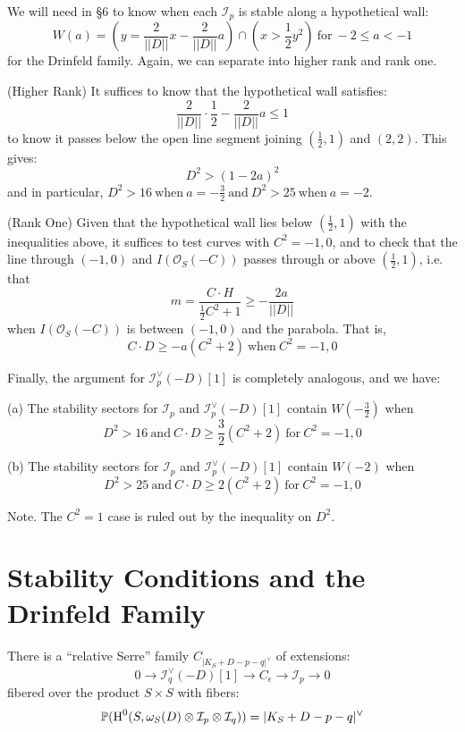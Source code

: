 \documentclass{amsart}
\begin{document}
\medskip


We will need in \S 6 to know when each ${\mathcal I}_p$ is stable along a hypothetical wall:
\[ W(a) = \left( y = \frac 2{||D||}x - \frac 2{||D||} a\right) \cap \left( x > \frac 12y^2\right)  \ \mbox{for} \ -2 \le a < -1 \] 
for the Drinfeld family.
Again, we can separate into higher rank and rank one. 

\medskip

\nt (Higher Rank) It suffices to know that the hypothetical wall satisfies:
\[ \frac 2{||D||} \cdot \frac 12 - \frac 2{||D||}a \le 1 \]  
to know it passes  below the open line segment joining $(\frac 12, 1)$ and $(2,2)$. This gives: 
\[ D^2 > (1 - 2a)^2 \] 
and in particular, 
$D^2 > 16 \ \mbox{when} \ a = -\frac 32 \ \mbox{and} \ D^2 > 25 \ \mbox{when} \ a = -2$.

\medskip 

\nt (Rank One) Given that the hypothetical wall lies below $(\frac 12,1)$ with the inequalities above, it suffices to 
test curves with $C^2 = -1, 0$, and to check that the line through 
$(-1,0)$ and $I({\mathcal O}_S(-C))$ passes through or above $(\frac 12, 1)$, i.e. that 
\[  m = \frac{C\cdot H}{\frac 12 C^2 + 1} \ge -\frac{2a}{||D||}  \] 
when $I({\mathcal O}_S(-C))$ is between $(-1,0)$ and the parabola. That is, 
\[ C \cdot D \ge -a(C^2 + 2) \ \mbox{when} \ C^2 = -1,0 \]  

Finally, the argument for ${\mathcal I}^\vee_p(-D)[1]$ is completely analogous, and we have: 

\medskip

 (a) The stability sectors for ${\mathcal I}_p$ and ${\mathcal I}_p^\vee(-D)[1]$ contain $W(-\frac 32)$ when
 \[ D^2 > 16 \ \mbox{and} \  C \cdot D \ge \frac 32(C^2 + 2)  \ \mbox{for} \ C^2 = -1,0 \] 

(b) The stability sectors for ${\mathcal I}_p$ and ${\mathcal I}_p^\vee(-D)[1]$ contain $W(-2)$ when
\[ D^2 > 25 \ \mbox{and} \  C \cdot D \ge 2(C^2 + 2)  \ \mbox{for} \ C^2 = -1,0 \] 

\nt Note. The  $C^2 = 1$ case is ruled out by the inequality on $D^2$. 

\section{Stability Conditions and the Drinfeld Family} 

There is a  ``relative Serre'' family $C_{|K_S + D - p - q|^\vee}$  of extensions: 
\[ 0 \rightarrow {\mathcal I}_q^\vee(-D)[1] \rightarrow C_\epsilon \rightarrow {\mathcal I}_p \rightarrow 0 \] 
fibered over the product $S \times S$ with fibers:
\[ {\mathbb P}(\mbox{H}^0(S, \omega_S(D) \otimes {\mathcal I}_p \otimes {\mathcal I}_q)) = |K_S + D - p - q|^\vee \]  
\end{document}
